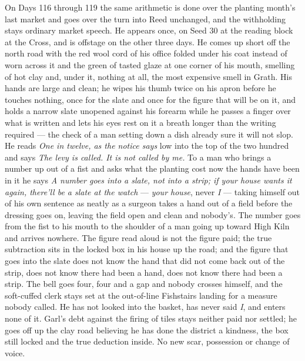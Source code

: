 \documentclass{design/chronicle}
\begin{document}
{On Days 116 through 119 the same arithmetic is done over the planting month’s last market and goes over the turn into Reed unchanged, and the withholding stays ordinary market speech. He appears once, on Seed 30 at the reading block at the Cross, and is offstage on the other three days. He comes up short off the north road with the red wool cord of his office folded under his coat instead of worn across it and the green of tasted glaze at one corner of his mouth, smelling of hot clay and, under it, nothing at all, the most expensive smell in Grath. His hands are large and clean; he wipes his thumb twice on his apron before he touches nothing, once for the slate and once for the figure that will be on it, and holds a narrow slate unopened against his forearm while he passes a finger over what is written and lets his eyes rest on it a breath longer than the writing required — the check of a man setting down a dish already sure it will not slop. He reads \emph{One in twelve, as the notice says} low into the top of the two hundred and says \emph{The levy is called. It is not called by me.} To a man who brings a number up out of a fist and asks what the planting cost now the hands have been in it he says \emph{A number goes into a slate, not into a strip; if your house wants it again, there’ll be a slate at the watch} — \emph{your house}, never \emph{I} — taking himself out of his own sentence as neatly as a surgeon takes a hand out of a field before the dressing goes on, leaving the field open and clean and nobody’s. The number goes from the fist to his mouth to the shoulder of a man going up toward High Kiln and arrives nowhere. The figure read aloud is not the figure paid; the true subtraction sits in the locked box in his house up the road; and the figure that goes into the slate does not know the hand that did not come back out of the strip, does not know there had been a hand, does not know there had been a strip. The bell goes four, four and a gap and nobody crosses himself, and the soft-cuffed clerk stays set at the out-of-line Fishstairs landing for a measure nobody called. He has not looked into the basket, has never said \emph{I}, and enters none of it. Garl’s debt against the firing of tiles stays neither paid nor settled; he goes off up the clay road believing he has done the district a kindness, the box still locked and the true deduction inside. No new scar, possession or change of voice.

}
\end{document}
